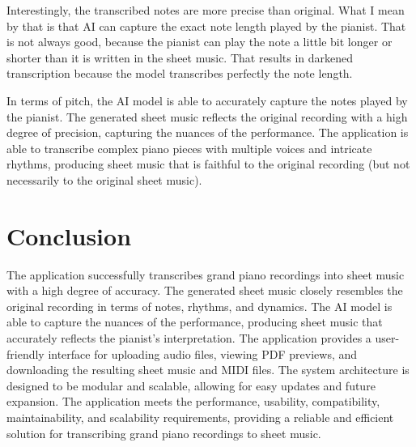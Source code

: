 \documentclass{article}
\begin{document}
Interestingly, the transcribed notes are more precise than original. What I mean by that is that AI can capture the exact note length played by the pianist. That is not always good, because the pianist can play the note a little bit longer or shorter than it is written in the sheet music. That results in darkened transcription because the model transcribes perfectly the note length.

In terms of pitch, the AI model is able to accurately capture the notes played by the pianist. The generated sheet music reflects the original recording with a high degree of precision, capturing the nuances of the performance. The application is able to transcribe complex piano pieces with multiple voices and intricate rhythms, producing sheet music that is faithful to the original recording (but not necessarily to the original sheet music).

\section{Conclusion}
The application successfully transcribes grand piano recordings into sheet music with a high degree of accuracy. The generated sheet music closely resembles the original recording in terms of notes, rhythms, and dynamics. The AI model is able to capture the nuances of the performance, producing sheet music that accurately reflects the pianist's interpretation. The application provides a user-friendly interface for uploading audio files, viewing PDF previews, and downloading the resulting sheet music and MIDI files. The system architecture is designed to be modular and scalable, allowing for easy updates and future expansion. The application meets the performance, usability, compatibility, maintainability, and scalability requirements, providing a reliable and efficient solution for transcribing grand piano recordings to sheet music.

\FloatBarrier
\end{document}
